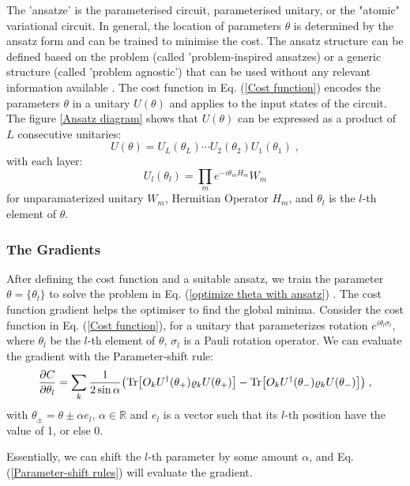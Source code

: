 The 'ansatze' is the parameterised circuit, parameterised unitary, or the "atomic" variational circuit.
In general, the location of parameters $\theta$ is determined by the ansatz form and can be trained to minimise the cost.
The ansatz structure can be defined based on the problem (called 'problem-inspired ansatzes) or a generic structure (called 'problem agnostic') that can be used without any relevant information available \cite{cerezo2021variational}.
The cost function in Eq. (\ref{Cost function}) encodes the parameters $\theta$ in a unitary $U(\theta)$ and applies to the input states of the circuit. 
The figure \ref{Ansatz diagram} shows that $U(\theta)$ can be expressed as a product of $L$ consecutive unitaries:
\begin{equation}
    U(\theta) = U_L(\theta_L) \cdots U_2(\theta_2) U_1(\theta_1)\;,
\end{equation}
with each layer:
\begin{equation}
    U_l(\theta_l) = \prod_m e^{-i\theta_m H_m} W_m
\end{equation}
for unparamaterized unitary $W_m$, Hermitian Operator $H_m$, and $\theta_l$ is the $l$-th element of $\theta$.

\subsubsection{The Gradients}
After defining the cost function and a suitable ansatz, we train the parameter $\theta = \{\theta_{l}\}$ to solve the problem in Eq. (\ref{optimize theta with ansatz}) \cite{cerezo2021variational}.
The cost function gradient helps the optimiser to find the global minima. 
Consider the cost function in Eq. (\ref{Cost function}), for a unitary that parameterizes rotation $e^{i \theta_l \sigma_{l}}$, where $\theta_l$ be the $l$-th element of $\theta$, $\sigma_l$ is a Pauli rotation operator. 
We can evaluate the gradient with the Parameter-shift rule:
\begin{equation}
    \frac{\partial C}{\partial\theta_l}
    = \sum_k \frac{1}{2 \sin{\alpha}} 
    \left( 
        \Tr[O_k U^\dagger(\theta_+) \rho_k U(\theta_+)] 
        - \Tr[O_k U^\dagger(\theta_-) \rho_k U(\theta_-)]
    \right) \;,
    \label{Parameter-shift rules}
\end{equation}
with $\theta_{\pm} = \theta \pm \alpha e_l$, $\alpha \in \mathbb{R}$ and $e_l$ is a vector such that its $l$-th position have the value of 1, or else 0.

Essentially, we can shift the $l$-th parameter by some amount $\alpha$, and Eq. (\ref{Parameter-shift rules}) will evaluate the gradient. 


